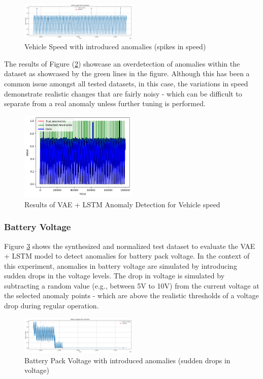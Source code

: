 \documentclass[conference]{IEEEtran}
\begin{document}
\begin{figure}[htbp]
    \centering
    \includegraphics[width=0.5\textwidth]{aj_fig_3.png}
    \caption{Vehicle Speed with introduced anomalies (spikes in speed)}
    \label{aj_fig__3}
\end{figure}

The results of Figure (\ref{aj_fig__4}) showcase an overdetection of anomalies within the dataset as showcased by the green lines in the figure. Although this has been a common issue amongst all tested datasets, in this case, the variations in speed demonstrate realistic changes that are fairly noisy - which can be difficult to separate from a real anomaly unless further tuning is performed. 

\begin{figure}[htbp]
    \centering
    \includegraphics[width=0.5\textwidth]{aj_fig_4.png}
    \caption{Results of VAE + LSTM Anomaly Detection for Vehicle speed}
    \label{aj_fig__4}
\end{figure}

\subsubsection{Battery Voltage}
Figure \ref{aj_fig__5} shows the synthesized and normalized test dataset to evaluate the VAE + LSTM model to detect anomalies for battery pack voltage. In the context of this experiment, anomalies in battery voltage are simulated by introducing sudden drops in the voltage levels. The drop in voltage is simulated by subtracting a random value (e.g., between 5V to 10V) from the current voltage at the selected anomaly points - which are above the realistic thresholds of a voltage drop during regular operation.

\begin{figure}[htbp]
    \centering
    \includegraphics[width=0.5\textwidth]{aj_fig_5.png}
    \caption{Battery Pack Voltage with introduced anomalies (sudden drops in voltage)}
    \label{aj_fig__5}
\end{figure}
\end{document}
